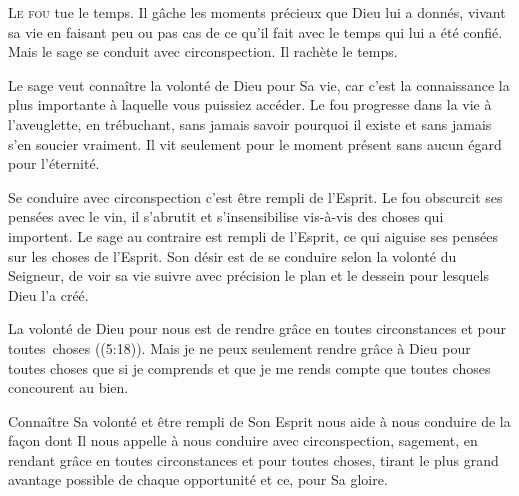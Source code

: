 \dvrule







\lettrine{L}{e fou} tue le temps.
 Il gâche les moments précieux que Dieu lui a donnés,
 vivant sa vie en faisant peu ou pas cas de ce qu'il fait
 avec le temps qui lui a été confié.
 Mais le sage se conduit avec circonspection. Il rachète le temps.

Le sage veut connaître la volonté de Dieu pour Sa vie,
 car c'est la connaissance la plus importante à laquelle vous puissiez accéder.
 Le fou progresse dans la vie à l'aveuglette, en trébuchant,
 sans jamais savoir pourquoi il existe et sans jamais s'en soucier vraiment.
 Il vit seulement pour le moment présent sans aucun égard pour l'éternité.


Se conduire avec circonspection c'est être rempli de l'Esprit.
 Le fou obscurcit ses pensées avec le vin, il s'abrutit et s'insensibilise
 vis-à-vis des choses qui importent. Le sage au contraire est rempli
 de l'Esprit, ce qui aiguise ses pensées sur les choses de l'Esprit.
 Son désir est de se conduire selon la volonté du Seigneur, 
 de voir sa vie suivre avec précision le plan et le dessein
 pour lesquels Dieu l'a créé.

La volonté de Dieu pour nous est de rendre grâce en toutes circonstances
 et pour toutes~choses ((5:18)).
 Mais je ne peux seulement rendre grâce à Dieu pour toutes choses
 que si je comprends et que je me rends compte que toutes choses
 concourent au bien.

Connaître Sa volonté et être rempli de Son Esprit nous aide 
 à nous conduire de la fa\c{c}on dont Il nous appelle à nous conduire
 \ocadr avec circonspection, sagement, en rendant grâce en toutes circonstances
 et pour toutes choses, tirant le plus grand avantage possible
 de chaque opportunité \fcadr{} et ce, pour Sa gloire.

